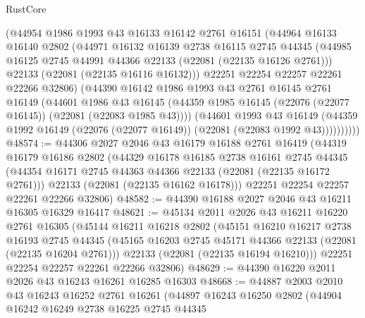 \begin{lexlean}{RustCore}
\begin{coremodule}
            (@44954
              @1986
              @1993
              @43
              @16133
              @16142
              @2761
              @16151
              (@44964
                @16133
                @16140
                @2802
                (@44971
                  @16132
                  @16139
                  @2738
                  @16115
                  @2745
                  @44345
                  (@44985 @16125 @2745 @44991 @44366 @22133 (@22081 (@22135 @16126 @2761)))
                  @22133
                  (@22081 (@22135 @16116 @16132)))
                @22251
                @22254
                @22257
                @22261
                @22266
                @32806)
              (@44390
                @16142
                @1986
                @1993
                @43
                @2761
                @16145
                @2761
                @16149
                (@44601
                  @1986
                  @43
                  @16145
                  (@44359 @1985 @16145 (@22076 (@22077 @16145)) (@22081 (@22083 @1985 @43))))
                (@44601
                  @1993
                  @43
                  @16149
                  (@44359 @1992 @16149 (@22076 (@22077 @16149)) (@22081 (@22083 @1992 @43))))))))))
@48574 := @44306
    @2027
    @2046
    @43
    @16179
    @16188
    @2761
    @16419
    (@44319
      @16179
      @16186
      @2802
      (@44329
        @16178
        @16185
        @2738
        @16161
        @2745
        @44345
        (@44354 @16171 @2745 @44363 @44366 @22133 (@22081 (@22135 @16172 @2761)))
        @22133
        (@22081 (@22135 @16162 @16178)))
      @22251
      @22254
      @22257
      @22261
      @22266
      @32806)
@48582 := @44390 @16188 @2027 @2046 @43 @16211 @16305 @16329 @16417
@48621 := @45134
    @2011
    @2026
    @43
    @16211
    @16220
    @2761
    @16305
    (@45144
      @16211
      @16218
      @2802
      (@45151
        @16210
        @16217
        @2738
        @16193
        @2745
        @44345
        (@45165 @16203 @2745 @45171 @44366 @22133 (@22081 (@22135 @16204 @2761)))
        @22133
        (@22081 (@22135 @16194 @16210)))
      @22251
      @22254
      @22257
      @22261
      @22266
      @32806)
@48629 := @44390 @16220 @2011 @2026 @43 @16243 @16261 @16285 @16303
@48668 := @44887
    @2003
    @2010
    @43
    @16243
    @16252
    @2761
    @16261
    (@44897
      @16243
      @16250
      @2802
      (@44904
        @16242
        @16249
        @2738
        @16225
        @2745
        @44345

\end{coremodule}
\end{lexlean}
